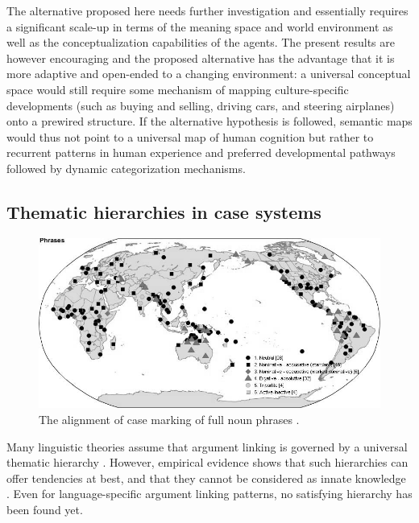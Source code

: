 The alternative proposed here needs further investigation and essentially requires a significant scale-up in terms of the meaning space and world environment as well as the conceptualization capabilities of the agents. The present results are however encouraging and the proposed alternative has the advantage that it is more adaptive and open-ended to a changing environment: a universal conceptual space would still require some mechanism of mapping culture-specific developments (such as buying and selling, driving cars, and steering airplanes) onto a prewired structure. If the alternative hypothesis is followed, semantic maps would thus not point to a universal map of human cognition but rather to recurrent patterns in human experience and preferred developmental pathways followed by dynamic categorization mechanisms.

\subsection{Thematic hierarchies in case systems}
\label{s:comp-thematic}

\begin{figure}[t]
\centerline{\includegraphics[width=\textwidth]{Chapter5/figs/wals.jpg}}
  \caption[Alignment of case marking of full noun phrases \citep{comrie05wals}]{The alignment of case marking of full noun phrases \citep[98]{comrie05wals}.}
   \label{f:wals}
\end{figure}

Many linguistic theories assume that argument linking is governed by a universal thematic hierarchy \citep[e.g.][]{dik97functional, fillmore68case, givon01syntax, jackendoff90semantic, keenan77noun}. However, empirical evidence shows that such hierarchies can offer tendencies at best, and that they cannot be considered as innate knowledge \citep{levin05argument}. Even for language-specific argument linking patterns, no satisfying hierarchy has been found yet.

